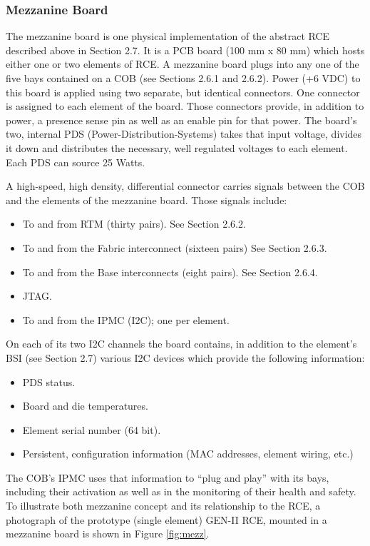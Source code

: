 \subsubsection{Mezzanine Board}

The mezzanine board is one physical implementation of the abstract RCE described above in Section 2.7. It is a PCB board (100 mm x 80 mm) which hosts either one or two elements of RCE. A mezzanine board plugs into any one of the five bays contained on a COB (see Sections 2.6.1 and 2.6.2).
Power (+6 VDC) to this board is applied using two separate, but identical connectors. One connector is assigned to each element of the board. Those connectors provide, in addition to power, a presence sense pin as well as an enable pin for that power. The board's two, internal PDS (Power-Distribution-Systems) takes that input voltage, divides it down and distributes the necessary, well regulated voltages to each element. Each PDS can source 25 Watts.

A high-speed, high density, differential connector carries signals between the COB and the elements of the mezzanine board. Those signals include:
\begin{itemize}
\item  To and from RTM (thirty pairs). See Section 2.6.2.
\item To and from the Fabric interconnect (sixteen pairs) See Section 2.6.3.
\item To and from the Base interconnects (eight pairs). See Section 2.6.4.
\item JTAG.
\item To and from the IPMC (I2C); one per element.
\end{itemize}
On each of its two I2C channels the board contains, in addition to the element's BSI (see Section 2.7) various I2C devices which provide the following information:
\begin{itemize}
\item PDS status.
\item Board and die temperatures.
\item Element serial number (64 bit).
\item Persistent, configuration information (MAC addresses, element wiring, etc.)
\end{itemize}

The COB's IPMC uses that information to “plug and play” with its bays, including their activation as well as in the monitoring of their health and safety.
To illustrate both mezzanine concept and its relationship to the RCE, a photograph of the prototype (single element) GEN-II RCE, mounted in a mezzanine board is shown in Figure \ref{fig:mezz}.

